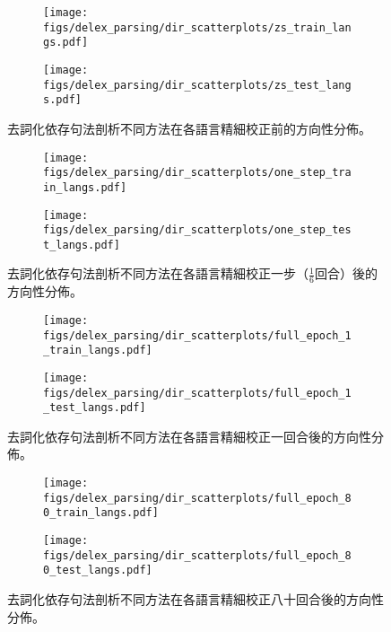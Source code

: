 \begin{figure}[htbp]
    \centering
    \begin{subfigure}[t]{0.7\textwidth}
        \centering
        \texttt{[image: figs/delex\_parsing/dir\_scatterplots/zs\_train\_langs.pdf]}
    \end{subfigure}
    \vspace{-12pt}
    \begin{subfigure}[t]{0.7\textwidth}
        \centering
        \texttt{[image: figs/delex\_parsing/dir\_scatterplots/zs\_test\_langs.pdf]}
    \end{subfigure}
    \caption{去詞化依存句法剖析不同方法在各語言精細校正前的方向性分佈。}
    \label{fig:dir_scatter_zs}
\end{figure}
\begin{figure}[htbp]
    \centering
    \begin{subfigure}[t]{0.7\textwidth}
        \centering
        \texttt{[image: figs/delex\_parsing/dir\_scatterplots/one\_step\_train\_langs.pdf]}
    \end{subfigure}
    \vspace{-12pt}
    \begin{subfigure}[t]{0.7\textwidth}
        \centering
        \texttt{[image: figs/delex\_parsing/dir\_scatterplots/one\_step\_test\_langs.pdf]}
    \end{subfigure}
    \caption{去詞化依存句法剖析不同方法在各語言精細校正一步（$\frac{1}{6}$回合）後的方向性分佈。}
    \label{fig:dir_scatter_one_step}
\end{figure}
\begin{figure}[htbp]
    \centering
    \begin{subfigure}[t]{0.7\textwidth}
        \centering
        \texttt{[image: figs/delex\_parsing/dir\_scatterplots/full\_epoch\_1\_train\_langs.pdf]}
    \end{subfigure}
    \vspace{-12pt}
    \begin{subfigure}[t]{0.7\textwidth}
        \centering
        \texttt{[image: figs/delex\_parsing/dir\_scatterplots/full\_epoch\_1\_test\_langs.pdf]}
    \end{subfigure}
    \caption{去詞化依存句法剖析不同方法在各語言精細校正一回合後的方向性分佈。}
    \label{fig:dir_scatter_full_epoch_1}
\end{figure}
\begin{figure}[htbp]
    \centering
    \begin{subfigure}[t]{0.7\textwidth}
        \centering
        \texttt{[image: figs/delex\_parsing/dir\_scatterplots/full\_epoch\_80\_train\_langs.pdf]}
    \end{subfigure}
    \vspace{-12pt}
    \begin{subfigure}[t]{0.7\textwidth}
        \centering
        \texttt{[image: figs/delex\_parsing/dir\_scatterplots/full\_epoch\_80\_test\_langs.pdf]}
    \end{subfigure}
    \caption{去詞化依存句法剖析不同方法在各語言精細校正八十回合後的方向性分佈。}
    \label{fig:dir_scatter_full_epoch_80}
\end{figure}